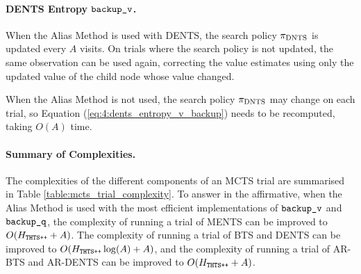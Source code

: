     \paragraph{DENTS Entropy ${\textnormal{\texttt{backup\_v}}}$.}

    When the Alias Method is used with DENTS, the search policy ${\pi_{{\textnormal{DNTS}}}}$ is updated every $A$ visits. On trials where the search policy is not updated, the same observation can be used again, correcting the value estimates using only the updated value of the child node whose value changed.

    When the Alias Method is not used, the search policy ${\pi_{{\textnormal{DNTS}}}}$ may change on each trial, so Equation (\ref{eq:4:dents_entropy_v_backup}) needs to be recomputed, taking $O(A)$ time.

    \paragraph{Summary of Complexities.}

    The complexities of the different components of an MCTS trial are summarised in Table \ref{table:mcts_trial_complexity}. To answer \complexityq in the affirmative, when the Alias Method is used with the most efficient implementations of ${\textnormal{\texttt{backup\_v}}}$ and ${\textnormal{\texttt{backup\_q}}}$, the complexity of running a trial of MENTS can be improved to $O(H_{{\textnormal{\texttt{THTS++}}}}+A)$. The complexity of running a trial of BTS and DENTS can be improved to $O(H_{{\textnormal{\texttt{THTS++}}}}\log(A)+A)$, and the complexity of running a trial of AR-BTS and AR-DENTS can be improved to $O(H_{{\textnormal{\texttt{THTS++}}}}+A)$. 


